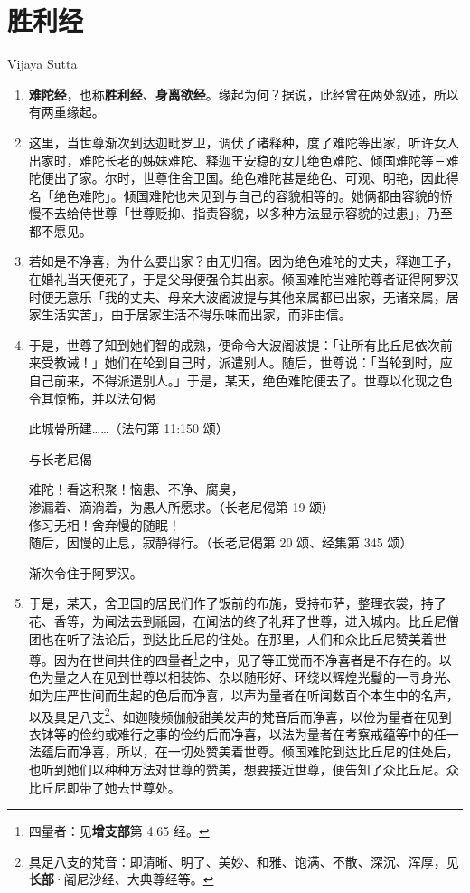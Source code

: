 \section{胜利经}

\begin{center}Vijaya Sutta\end{center}\vspace{1em}

\begin{enumerate}\item \textbf{难陀经}，也称\textbf{胜利经}、\textbf{身离欲经}。缘起为何？据说，此经曾在两处叙述，所以有两重缘起。
\item 这里，当世尊渐次到达迦毗罗卫，调伏了诸释种，度了难陀等出家，听许女人出家时，难陀长老的姊妹难陀、释迦王安稳的女儿绝色难陀、倾国难陀等三难陀便出了家。尔时，世尊住舍卫国。绝色难陀甚是绝色、可观、明艳，因此得名「绝色难陀」。倾国难陀也未见到与自己的容貌相等的。她俩都由容貌的㤭慢不去给侍世尊「世尊贬抑、指责容貌，以多种方法显示容貌的过患」，乃至都不愿见。
\item 若如是不净喜，为什么要出家？由无归宿。因为绝色难陀的丈夫，释迦王子，在婚礼当天便死了，于是父母便强令其出家。倾国难陀当难陀尊者证得阿罗汉时便无意乐「我的丈夫、母亲大波阇波提与其他亲属都已出家，无诸亲属，居家生活实苦」，由于居家生活不得乐味而出家，而非由信。
\item 于是，世尊了知到她们智的成熟，便命令大波阇波提：「让所有比丘尼依次前来受教诫！」她们在轮到自己时，派遣别人。随后，世尊说：「当轮到时，应自己前来，不得派遣别人。」于是，某天，绝色难陀便去了。世尊以化现之色令其惊怖，并以法句偈\begin{quoting}此城骨所建……（法句第 11:150 颂）\end{quoting}与长老尼偈\begin{quoting}难陀！看这积聚！恼患、不净、腐臭，\\渗漏着、滴淌着，为愚人所愿求。（长老尼偈第 19 颂）\\修习无相！舍弃慢的随眠！\\随后，因慢的止息，寂静得行。（长老尼偈第 20 颂、经集第 345 颂）\end{quoting}渐次令住于阿罗汉。
\item 于是，某天，舍卫国的居民们作了饭前的布施，受持布萨，整理衣裳，持了花、香等，为闻法去到祇园，在闻法的终了礼拜了世尊，进入城内。比丘尼僧团也在听了法论后，到达比丘尼的住处。在那里，人们和众比丘尼赞美着世尊。因为在世间共住的四量者\footnote{四量者：见\textbf{增支部}第 4:65 经。}之中，见了等正觉而不净喜者是不存在的。以色为量之人在见到世尊以相装饰、杂以随形好、环绕以辉煌光鬘的一寻身光、如为庄严世间而生起的色后而净喜，以声为量者在听闻数百个本生中的名声，以及具足八支\footnote{具足八支的梵音：即清晰、明了、美妙、和雅、饱满、不散、深沉、浑厚，见\textbf{长部}·阇尼沙经、大典尊经等。}、如迦陵频伽般甜美发声的梵音后而净喜，以俭为量者在见到衣钵等的俭约或难行之事的俭约后而净喜，以法为量者在考察戒蕴等中的任一法蕴后而净喜，所以，在一切处赞美着世尊。倾国难陀到达比丘尼的住处后，也听到她们以种种方法对世尊的赞美，想要接近世尊，便告知了众比丘尼。众比丘尼即带了她去世尊处。

\end{enumerate}

